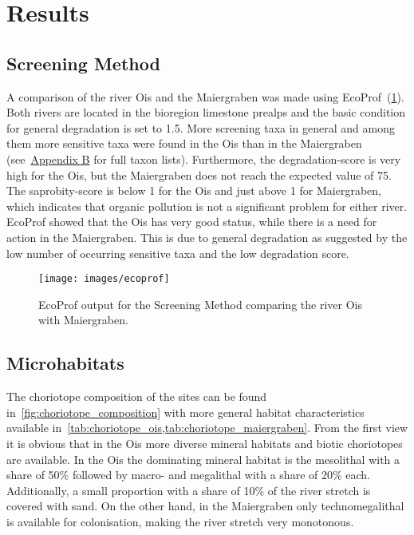 \section{Results}\label{sec:results}




\subsection{Screening Method}\label{sec:screening_method}       %

A comparison of the river Ois and the Maiergraben was made using EcoProf~(\cref{fig:ecoprof}). Both rivers are located in the bioregion limestone prealps and the basic condition for general degradation is set to 1.5. More screening taxa in general and among them more sensitive taxa were found in the Ois than in the Maiergraben (see~\hyperref[appendixB]{Appendix B} for full taxon lists). Furthermore, the degradation-score is very high for the Ois, but the Maiergraben does not reach the expected value of 75. The saprobity-score is below 1 for the Ois and just above 1 for Maiergraben, which indicates that organic pollution is not a significant problem for either river. EcoProf showed that the Ois has very good status, while there is a need for action in the Maiergraben. This is due to general degradation as suggested by the low number of occurring sensitive taxa and the low degradation score.

\begin{figure}[!htb]                              %
  \center
  \texttt{[image: images/ecoprof]}                %
  \caption{EcoProf output for the Screening Method comparing the river Ois with Maiergraben.}        %
  \label{fig:ecoprof}                                                       %
\end{figure}




\subsection{Microhabitats}\label{sec:microhabitats_results}       %

The choriotope composition of the sites can be found in~\cref{fig:choriotope_composition} with more general habitat characteristics available in~\cref{tab:choriotope_ois,tab:choriotope_maiergraben}. From the first view it is obvious that in the Ois more diverse mineral habitats and biotic choriotopes are available. In the Ois the dominating mineral habitat is the mesolithal with a share of 50\% followed by macro- and megalithal with a share of 20\% each. Additionally, a small proportion with a share of 10\% of the river stretch is covered with sand. On the other hand, in the Maiergraben only technomegalithal is available for colonisation, making the river stretch very monotonous.


